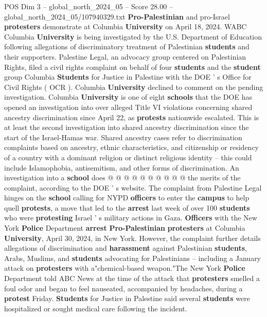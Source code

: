 \begin{textsample}{POS Dim 3 – global\_north\_2024\_05 – Score 28.00 – global\_north\_2024\_05/107940329.txt}  \label{ex:f3_pos_007}
\textbf{Pro-Palestinian} and pro-Israel \textbf{protesters} demonstrate at Columbia \textbf{University} on April 18, 2024.
WABC Columbia \textbf{University} is being investigated by the U.S.
Department of Education following allegations of discriminatory treatment of Palestinian \textbf{students} and their supporters.
Palestine Legal, an advocacy group centered on Palestinian Rights, filed a civil rights complaint on behalf of four \textbf{students} and the \textbf{student} group Columbia \textbf{Students} for Justice in Palestine with the DOE ' s Office for Civil Rights ( OCR ).
Columbia \textbf{University} declined to comment on the pending investigation.
Columbia \textbf{University} is one of eight \textbf{schools} that the DOE has opened an investigation into over alleged Title VI violations concerning shared ancestry discrimination since April 22, as \textbf{protests} nationwide escalated.
This is at least the second investigation into shared ancestry discrimination since the start of the Israel-Hamas war.
Shared ancestry cases refer to discrimination complaints based on ancestry, ethnic characteristics, and citizenship or residency of a country with a dominant religion or distinct religious identity -- this could include Islamophobia, antisemitism, and other forms of discrimination.
An investigation into a \textbf{school} does @ @ @ @ @ @ @ @ @ @ the merits of the complaint, according to the DOE ' s website.
The complaint from Palestine Legal hinges on the \textbf{school} calling for NYPD \textbf{officers} to enter the \textbf{campus} to help quell \textbf{protests}, a move that led to the \textbf{arrest} last week of over 100 \textbf{students} who were \textbf{protesting} Israel ' s military actions in Gaza. \textbf{Officers} with the New York \textbf{Police} Department \textbf{arrest} \textbf{Pro-Palestinian} \textbf{protesters} at Columbia \textbf{University}, April 30, 2024, in New York.
However, the complaint further details allegations of discrimination and \textbf{harassment} against Palestinian \textbf{students}, Arabs, Muslims, and \textbf{students} advocating for Palestinians -- including a January attack on \textbf{protesters} with a"chemical-based weapon."The New York \textbf{Police} Department told ABC News at the time of the attack that \textbf{protesters} smelled a foul odor and began to feel nauseated, accompanied by headaches, during a \textbf{protest} Friday. \textbf{Students} for Justice in Palestine said several \textbf{students} were hospitalized or sought medical care following the incident.

\end{textsample}

